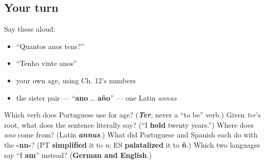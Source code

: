 \subsection*{Your turn}
Say these aloud:

\begin{itemize}
\raggedright
  \item \textquotedblleft{}Quantos anos tens?\textquotedblright{}
  \item \textquotedblleft{}Tenho vinte anos\textquotedblright{}
  \item your own age, using Ch. 12's numbers
  \item the sister pair — \textquotedblleft{}\textbf{ano} … \textbf{año}\textquotedblright{} — one Latin \emph{annus}
\end{itemize}

\begin{tcolorbox}[breakable,colback=teal!4,colframe=teal!35!black,title={Before you move on}]
Which verb does Portuguese use for age? (\emph{\textbf{Ter}}, never a \textquotedblleft{}to be\textquotedblright{} verb.) Given \emph{ter}'s root, what does the sentence literally say? (\textquotedblleft{}I \textbf{hold} twenty years.\textquotedblright{}) Where does \emph{ano} come from? (Latin \emph{\textbf{annus}}.) What did Portuguese and Spanish each do with the \textbf{-nn-}? (PT \textbf{simplified} it to \emph{n}; ES \textbf{palatalized} it to \textbf{ñ}.) Which two languages say \textquotedblleft{}I \textbf{am}\textquotedblright{} instead? (\textbf{German and English}.)
\end{tcolorbox}
